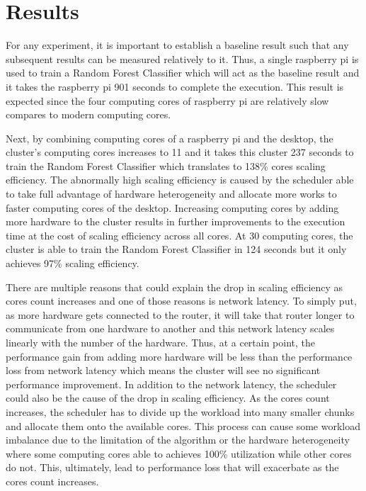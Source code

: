 \documentclass{IEEEtran}
\begin{document}
    \section{Results}   

        For any experiment, it is important to establish a baseline result such that any subsequent results can be measured relatively to it. Thus, a single raspberry pi is used to train a Random Forest Classifier which will act as the baseline result and it takes the raspberry pi 901 seconds to complete the execution. This result is expected since the four computing cores of raspberry pi are relatively slow compares to modern computing cores. 
            
        Next, by combining computing cores of a raspberry pi and the desktop, the cluster's computing cores increases to 11 and it takes this cluster 237 seconds to train the Random Forest Classifier which translates to 138\% cores scaling efficiency. The abnormally high scaling efficiency is caused by the scheduler able to take full advantage of hardware heterogeneity and allocate more works to faster computing cores of the desktop. Increasing computing cores by adding more hardware to the cluster results in further improvements to the execution time at the cost of scaling efficiency across all cores. At 30 computing cores, the cluster is able to train the Random Forest Classifier in 124 seconds but it only achieves 97\% scaling efficiency. 
        
        There are multiple reasons that could explain the drop in scaling efficiency as cores count increases and one of those reasons is network latency. To simply put, as more hardware gets connected to the router, it will take that router longer to communicate from one hardware to another and this network latency scales linearly with the number of the hardware. Thus, at a certain point, the performance gain from adding more hardware will be less than the performance loss from network latency which means the cluster will see no significant performance improvement. In addition to the network latency, the scheduler could also be the cause of the drop in scaling efficiency. As the cores count increases, the scheduler has to divide up the workload into many smaller chunks and allocate them onto the available cores. This process can cause some workload imbalance due to the limitation of the algorithm or the hardware heterogeneity where some computing cores able to achieves 100\% utilization while other cores do not. This, ultimately, lead to performance loss that will exacerbate as the cores count increases.            
\end{document}
